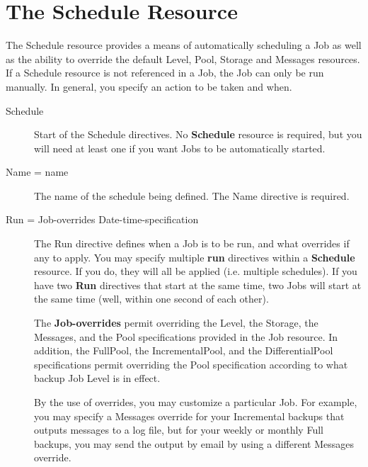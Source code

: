\section{The Schedule Resource}
\label{ScheduleResource}

The Schedule resource provides a means of automatically scheduling a Job as
well as the ability to override the default Level, Pool, Storage and Messages
resources. If a Schedule resource is not referenced in a Job, the Job can only
be run manually. In general, you specify an action to be taken and when. 

\begin{description}

\item [Schedule]
   Start of the Schedule directives.  No {\bf Schedule} resource is
   required, but you will need at least one if you want Jobs to be
   automatically started.

\item [Name = \lt{}name\gt{}]
   The name of the schedule being defined.  The Name directive is required. 

\item [Run = \lt{}Job-overrides\gt{} \lt{}Date-time-specification\gt{}]
   The Run directive defines when a Job is to be run, and what overrides if
   any to apply.  You may specify multiple {\bf run} directives within a
   {\bf Schedule} resource.  If you do, they will all be applied (i.e.
   multiple schedules).  If you have two {\bf Run} directives that start at
   the same time, two Jobs will start at the same time (well, within one
   second of each other).

   The {\bf Job-overrides} permit overriding the Level, the Storage, the
   Messages, and the Pool specifications provided in the Job resource.  In
   addition, the FullPool, the IncrementalPool, and the DifferentialPool
   specifications permit overriding the Pool specification according to
   what backup Job Level is in effect.

   By the use of overrides, you may customize a particular Job.  For
   example, you may specify a Messages override for your Incremental
   backups that outputs messages to a log file, but for your weekly or
   monthly Full backups, you may send the output by email by using a
   different Messages override.


\end{description}
